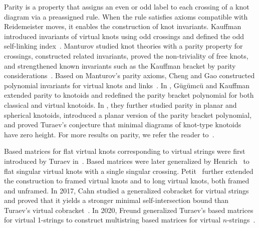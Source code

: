 \documentclass[12pt]{amsart}
\theoremstyle{noparens}
\numberwithin{equation}{section}
\numberwithin{equation}{section}
\begin{document}
Parity is a property that assigns an even or odd label to each crossing of a knot diagram via a preassigned rule. When the rule satisfies axioms compatible with Reidemeister moves, it enables the construction of knot invariants. Kauffman introduced invariants of virtual knots using odd crossings and defined the odd self-linking index~\cite{Kau2}. Manturov studied knot theories with a parity property for crossings, constructed related invariants, proved the non-triviality of free knots, and strengthened known invariants such as the Kauffman bracket by parity considerations~\cite{Man}. Based on Manturov's parity axioms, Cheng and Gao constructed polynomial invariants for virtual knots and links~\cite{CG}. In \cite{GK}, G\"ug\"umc\"u and Kauffman extended parity to knotoids and redefined the parity bracket polynomial for both classical and virtual knotoids. In \cite{GK2}, they further studied parity in planar and spherical knotoids, introduced a planar version of the parity bracket polynomial, and proved Turaev's conjecture that minimal diagrams of knot-type knotoids have zero height. For more results on parity, we refer the reader to~\cite{Afa,KK}.	

Based matrices for flat virtual knots corresponding to virtual strings were first introduced by Turaev in~\cite{Tur2}. Based matrices were later generalized by Henrich~\cite{Hen} to flat singular virtual knots with a single singular crossing. Petit~\cite{Pet} further extended the construction to framed virtual knots and to long virtual knots, both framed and unframed. In 2017, Cahn studied a generalized cobracket for virtual strings and proved that it yields a stronger minimal self-intersection bound than Turaev's virtual cobracket~\cite{Cahn}.
In 2020, Freund generalized Turaev's based matrices for virtual 1-strings to construct multistring based matrices for virtual $n$-strings~\cite{Fre}.
\end{document}
